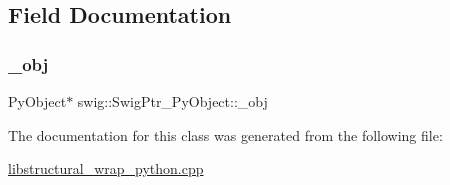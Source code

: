 \subsection{Field Documentation}
\mbox{\label{classswig_1_1_swig_ptr___py_object_ae617c5726496db423cd19688e3264618}} 
\subsubsection{\texorpdfstring{\+\_\+obj}{\_obj}}
{\footnotesize\ttfamily Py\+Object$\ast$ swig\+::\+Swig\+Ptr\+\_\+\+Py\+Object\+::\+\_\+obj\hspace{0.3cm}{\ttfamily [protected]}}



The documentation for this class was generated from the following file\+:\begin{DoxyCompactItemize}
\item 
\hyperlink{libstructural__wrap__python_8cpp}{libstructural\+\_\+wrap\+\_\+python.\+cpp}\end{DoxyCompactItemize}
